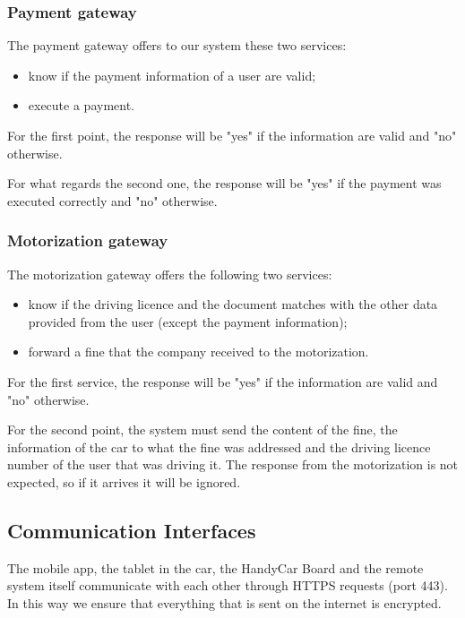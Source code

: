 \subsubsection{Payment gateway}
The payment gateway offers to our system these two services:
\begin{itemize}
\item know if the payment information of a user are valid;
\item execute a payment.
\end{itemize}

For the first point, the response will be "yes" if the information are valid and "no" otherwise.

For what regards the second one, the response will be "yes" if the payment was executed correctly and "no" otherwise.

\subsubsection{Motorization gateway}
The motorization gateway offers the following two services:
\begin{itemize}
\item know if the driving licence and the document matches with the other data provided from the user (except the payment information);
\item forward a fine that the company received to the motorization.
\end{itemize}

For the first service, the response will be "yes" if the information are valid and "no" otherwise.

For the second point, the system must send the content of the fine, the information of the car to what the fine was addressed and the driving licence number of the user that was driving it. The response from the motorization is not expected, so if it arrives it will be ignored.

\subsection{Communication Interfaces}
The mobile app, the tablet in the car, the HandyCar Board and the remote system itself communicate with each other through HTTPS requests (port 443). In this way we ensure that everything that is sent on the internet is encrypted.
